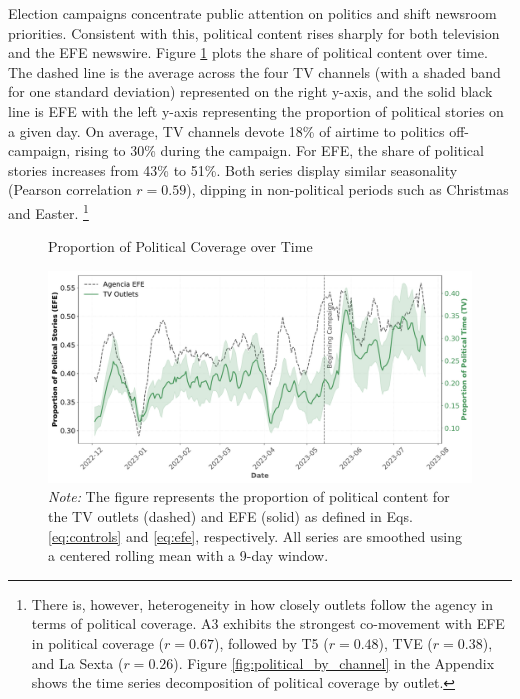 \documentclass[12pt]{article}
\begin{document}
	
	
	
	Election campaigns concentrate public attention on politics and shift newsroom priorities. Consistent with this, political content rises sharply for both television and the EFE newswire. Figure \ref{fig:coverage} plots the share of political content over time. The dashed line is the average across the four TV channels (with a shaded band for one standard deviation) represented on the right  y-axis, and the solid black line is  EFE with the left y-axis representing the proportion of political stories on a given day. On average, TV channels devote 18\% of airtime to politics off-campaign, rising to 30\% during the campaign. For EFE, the share of political stories increases from 43\% to 51\%. Both series display similar seasonality (Pearson correlation  $r=0.59$), dipping in non-political periods such as Christmas and Easter. \footnote{	There is, however, heterogeneity in how closely outlets follow the agency in terms of political coverage. A3 exhibits the strongest co-movement with EFE in political coverage ($r=0.67$), followed by T5 ($r=0.48$), TVE ($r=0.38$), and La Sexta ($r=0.26$). Figure \ref{fig:political_by_channel} in the Appendix shows the time series decomposition of political coverage by outlet.}
	
	
	
	
	
	\begin{figure}[!htb]
		\caption{Proportion of Political Coverage over Time}
		\centering
		\includegraphics[width=150mm]{figures/political_words_both}
		\caption*{\small \textit{Note:} The figure represents the proportion of political content for the TV outlets (dashed) and  EFE (solid) as defined in Eqs. \eqref{eq:controls} and \eqref{eq:efe}, respectively. All series are smoothed using a centered rolling mean with a 9-day window.}
		\label{fig:coverage}
	\end{figure}
	
\end{document}
